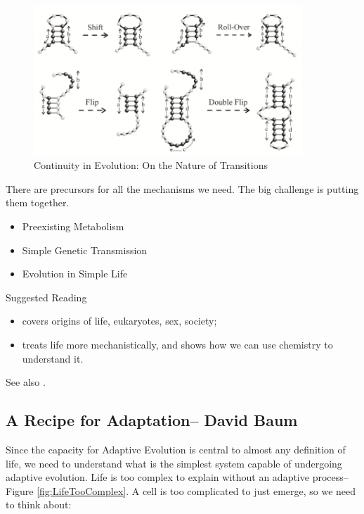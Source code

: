 \documentclass[]{article}
\begin{document}
\begin{figure}[H]
	\caption[Continuity in Evolution: On the Nature of Transitions]{Continuity in Evolution: On the Nature of Transitions\cite{fontana1998continuity}}\label{fig:ContinuityInEvolution}
	\includegraphics[width=0.9\textwidth]{ContinuityInEvolution}
\end{figure}

There are precursors for all the mechanisms we need. The big challenge is putting them together.
\begin{itemize}
	\item Preexisting Metabolism
	\item Simple Genetic Transmission
	\item Evolution in Simple Life
\end{itemize}

Suggested Reading
\begin{itemize}
	\item \cite{maynard1999origins} covers origins of life, eukaryotes, sex, society; 
	\item \cite{sumper1975evidence} treats life more mechanistically, and shows how we can use chemistry to understand it.
\end{itemize}

See also \cite{eigen1971selforganization,orgel2004prebiotic,kun2005real,ratcliff2014experimental}.

\subsection[A Recipe for Adaptation]{A Recipe for Adaptation-- David Baum}

Since the capacity for Adaptive Evolution is central to almost any definition of life, we need to understand what is the simplest system capable of undergoing adaptive evolution. Life is too complex to explain without an adaptive
process\cite{hoyle1983intelligent}--Figure \ref{fig:LifeTooComplex}. A cell is too complicated to  just emerge, so we need to think about:
\end{document}
